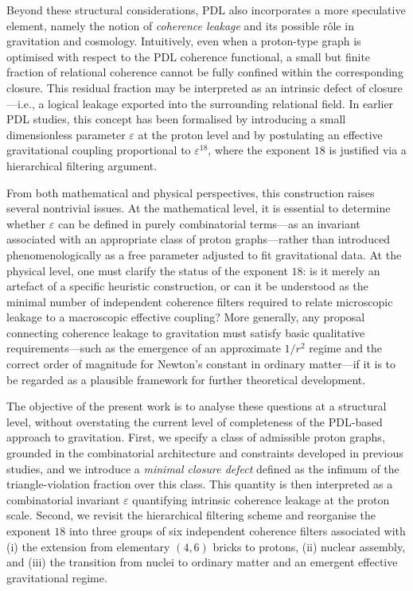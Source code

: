 \documentclass[11pt,a4paper]{article}
\theoremstyle{definition}
\begin{document}
Beyond these structural considerations, PDL also incorporates a more speculative element, namely the notion of \emph{coherence leakage} and its possible rôle in gravitation and cosmology.\cite{PDL_Main_2026,Exponent_18_PDL_2026,Topological_Reformulation_PDL_2026} Intuitively, even when a proton-type graph is optimised with respect to the PDL coherence functional, a small but finite fraction of relational coherence cannot be fully confined within the corresponding closure. This residual fraction may be interpreted as an intrinsic defect of closure—i.e., a logical leakage exported into the surrounding relational field.\cite{Topological_Reformulation_PDL_2026} In earlier PDL studies, this concept has been formalised by introducing a small dimensionless parameter $\varepsilon$ at the proton level and by postulating an effective gravitational coupling proportional to $\varepsilon^{18}$, where the exponent $18$ is justified via a hierarchical filtering argument.\cite{Exponent_18_PDL_2026}

From both mathematical and physical perspectives, this construction raises several nontrivial issues. At the mathematical level, it is essential to determine whether $\varepsilon$ can be defined in purely combinatorial terms—as an invariant associated with an appropriate class of proton graphs—rather than introduced phenomenologically as a free parameter adjusted to fit gravitational data.\cite{Topological_Reformulation_PDL_2026,PDL_Global_Mapping_2026} At the physical level, one must clarify the status of the exponent $18$: is it merely an artefact of a specific heuristic construction, or can it be understood as the minimal number of independent coherence filters required to relate microscopic leakage to a macroscopic effective coupling?\cite{Exponent_18_PDL_2026} More generally, any proposal connecting coherence leakage to gravitation must satisfy basic qualitative requirements—such as the emergence of an approximate $1/r^2$ regime and the correct order of magnitude for Newton’s constant in ordinary matter—if it is to be regarded as a plausible framework for further theoretical development.\cite{Effective_Fields_PDL_2026,PDL_Global_Mapping_2026}

The objective of the present work is to analyse these questions at a structural level, without overstating the current level of completeness of the PDL-based approach to gravitation. First, we specify a class of admissible proton graphs, grounded in the combinatorial architecture and constraints developed in previous studies, and we introduce a \emph{minimal closure defect} defined as the infimum of the triangle-violation fraction over this class.\cite{Combinatorial_Proton_v2_2026} This quantity is then interpreted as a combinatorial invariant $\varepsilon$ quantifying intrinsic coherence leakage at the proton scale.\cite{Topological_Reformulation_PDL_2026} Second, we revisit the hierarchical filtering scheme and reorganise the exponent $18$ into three groups of six independent coherence filters associated with (i) the extension from elementary $(4,6)$ bricks to protons, (ii) nuclear assembly, and (iii) the transition from nuclei to ordinary matter and an emergent effective gravitational regime.\cite{Exponent_18_PDL_2026,PDL_Global_Mapping_2026}
\end{document}
